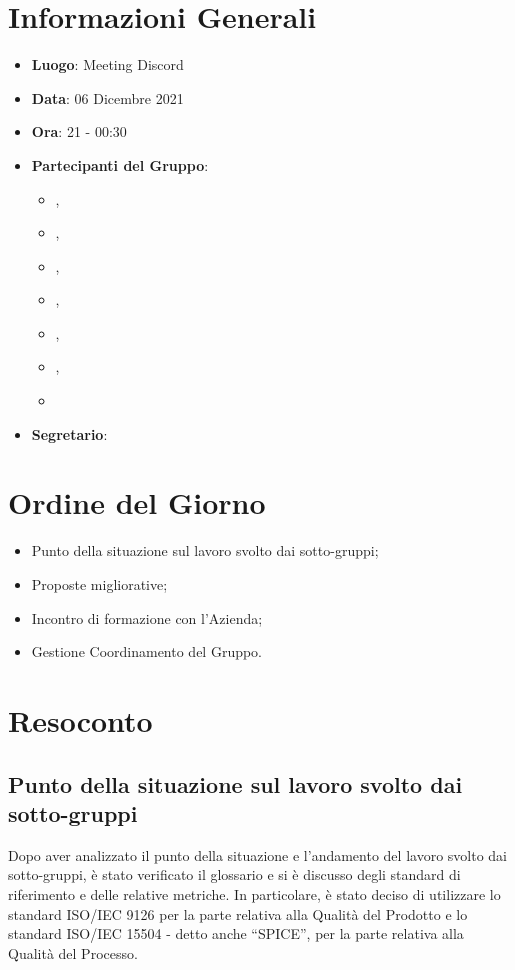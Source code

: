 \section{Informazioni Generali}

\begin{itemize}
\item{\textbf{Luogo}}: Meeting Discord
\item{\textbf{Data}}: 06 Dicembre 2021
\item{\textbf{Ora}}: 21 - 00:30
\item{\textbf{Partecipanti del Gruppo}}: 
	\begin{itemize}
	\item{\EP{},} 
	\item{\FP{},}
	\item{\GC{},}
	\item{\LW{},}
	\item{\MB{},}
	\item{\MG{},}
	\item{\PV{}}
	\end{itemize} 
\item{\textbf{Segretario}}: \PV{}	
\end{itemize}

\section{Ordine del Giorno}
\begin{itemize}
\item{Punto della situazione sul lavoro svolto dai sotto-gruppi;}
\item{Proposte migliorative;}
\item{Incontro di formazione con l'Azienda;}
\item{Gestione Coordinamento del Gruppo.}
\end{itemize}

\section{Resoconto}

\subsection{Punto della situazione sul lavoro svolto dai sotto-gruppi}

Dopo aver analizzato il punto della situazione e l'andamento del lavoro svolto dai sotto-gruppi, è stato verificato il glossario e si è discusso degli standard di riferimento e delle relative metriche. In particolare, è stato deciso di utilizzare lo standard ISO/IEC 9126 per la parte relativa alla Qualità del Prodotto e lo standard ISO/IEC 15504 - detto anche “SPICE”, per la parte relativa alla Qualità del Processo.

